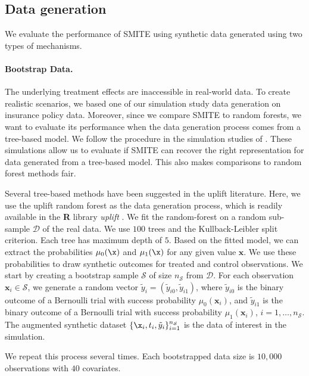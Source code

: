 \subsection{Data generation}

We evaluate the performance of SMITE using synthetic data generated using two types of mechanisms.

\paragraph{Bootstrap Data.} The underlying treatment effects are inaccessible in real-world data. To create realistic scenarios, we based one of our simulation study data generation on insurance policy data. Moreover, since we compare SMITE to random forests, we want to evaluate its performance when the data generation process comes from a tree-based model. We follow the procedure in the simulation studies of \cite{belba2019qbased}. These simulations allow us to evaluate if SMITE can recover the right representation for data generated from a tree-based model. This also makes comparisons to random forest methods fair.

Several tree-based methods have been suggested in the uplift literature. Here, we use the uplift random forest as the data generation process, which is readily available in the {\bf R} library {\it uplift} \citep{guelman2014R_uplift}. We fit the random-forest on a random sub-sample $\mathcal{D}$ of the real data. We use $100$ trees and the Kullback-Leibler split criterion. Each tree has maximum depth of $5$. Based on the fitted model, we can extract the probabilities $\mu_0(\x)$ and $\mu_1(\x)$ for any given value $\mathbf{x}$. We use these probabilities to draw synthetic outcomes for treated and control observations. We start by creating a bootstrap sample $\mathcal{S}$ of size $n_\mathcal{S}$ from $\mathcal{D}$. For each observation $\mathbf{x}_i \in \mathcal{S}$, we generate a random vector $\tilde{y}_i =(\tilde{y}_{i0}, \tilde{y}_{i1})$, where $\tilde{y}_{i0}$ is the binary outcome of a Bernoulli trial with success probability $\mu_0(\mathbf{x}_i)$, and  $\tilde{y}_{i1}$ is the binary outcome of a Bernoulli trial with success probability  $\mu_1(\mathbf{x}_i)$, $i=1,\ldots, n_\mathcal{S}$. The augmented synthetic dataset $\{ \x_i , t_i, \tilde{y}_i \}_{i=1}^{n_{\mathcal{S}}}$ is the data of interest in the simulation.

We repeat this process several times. Each bootstrapped data size is $10,000$ observations with $40$ covariates. 




